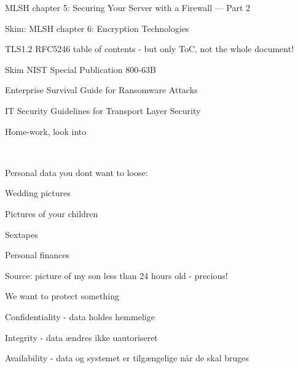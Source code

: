 \documentclass[Screen16to9,17pt]{foils}
\begin{document}

\begin{list1}
\item MLSH chapter 5: Securing Your Server with a Firewall — Part 2
\item Skim: MLSH chapter 6: Encryption Technologies
\item TLS1.2 RFC5246 table of contents - but only ToC, not the whole document!
\item Skim NIST Special Publication 800-63B
\item Enterprise Survival Guide for Ransomware Attacks
\item IT Security Guidelines for Transport Layer Security
\end{list1}

Home-work, look into {\small  {}}





{~}

\begin{list1}
\item Personal data you dont want to loose:
\begin{list2}
\item Wedding pictures
\item Pictures of your children
\item Sextapes
\item Personal finances
\end{list2}
\end{list1}

Source: picture of my son less than 24 hours old - precious!




\begin{list1}
\item We want to protect something
\item Confidentiality - data holdes hemmelige
\item Integrity - data ændres ikke uautoriseret
\item Availability - data og systemet er tilgængelige når de skal bruges
\end{list1}



\end{document}
